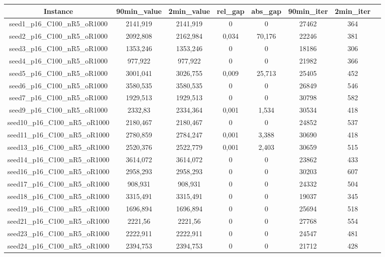 \documentclass[a4paper]{article}
\begin{document}
\begin{center}
\begin{longtable}{cccccccc}
\tabularnewline
\hline
Instance & 90min\_value & 2min\_value & rel\_gap & abs\_gap & 90min\_iter & 2min\_iter\\
\hline
seed1\_p16\_C100\_nR5\_oR1000 & 2141,919 & 2141,919 & 0 & 0 & 27462 & 364\\
\hline
seed2\_p16\_C100\_nR5\_oR1000 & 2092,808 & 2162,984 & 0,034 & 70,176 & 22246 & 381\\
\hline
seed3\_p16\_C100\_nR5\_oR1000 & 1353,246 & 1353,246 & 0 & 0 & 18186 & 306\\
\hline
seed4\_p16\_C100\_nR5\_oR1000 & 977,922 & 977,922 & 0 & 0 & 21982 & 366\\
\hline
seed5\_p16\_C100\_nR5\_oR1000 & 3001,041 & 3026,755 & 0,009 & 25,713 & 25405 & 452\\
\hline
seed6\_p16\_C100\_nR5\_oR1000 & 3580,535 & 3580,535 & 0 & 0 & 26849 & 546\\
\hline
seed7\_p16\_C100\_nR5\_oR1000 & 1929,513 & 1929,513 & 0 & 0 & 30798 & 582\\
\hline
seed9\_p16\_C100\_nR5\_oR1000 & 2332,83 & 2334,364 & 0,001 & 1,534 & 30534 & 418\\
\hline
seed10\_p16\_C100\_nR5\_oR1000 & 2180,467 & 2180,467 & 0 & 0 & 24852 & 537\\
\hline
seed11\_p16\_C100\_nR5\_oR1000 & 2780,859 & 2784,247 & 0,001 & 3,388 & 30690 & 418\\
\hline
seed13\_p16\_C100\_nR5\_oR1000 & 2520,376 & 2522,779 & 0,001 & 2,403 & 30659 & 515\\
\hline
seed14\_p16\_C100\_nR5\_oR1000 & 3614,072 & 3614,072 & 0 & 0 & 23862 & 433\\
\hline
seed16\_p16\_C100\_nR5\_oR1000 & 2958,293 & 2958,293 & 0 & 0 & 30203 & 607\\
\hline
seed17\_p16\_C100\_nR5\_oR1000 & 908,931 & 908,931 & 0 & 0 & 24332 & 504\\
\hline
seed18\_p16\_C100\_nR5\_oR1000 & 3315,491 & 3315,491 & 0 & 0 & 19037 & 345\\
\hline
seed19\_p16\_C100\_nR5\_oR1000 & 1696,894 & 1696,894 & 0 & 0 & 25694 & 518\\
\hline
seed21\_p16\_C100\_nR5\_oR1000 & 2221,56 & 2221,56 & 0 & 0 & 27768 & 554\\
\hline
seed23\_p16\_C100\_nR5\_oR1000 & 2222,911 & 2222,911 & 0 & 0 & 24547 & 481\\
\hline
seed24\_p16\_C100\_nR5\_oR1000 & 2394,753 & 2394,753 & 0 & 0 & 21712 & 428\\

\end{longtable}
\end{center}
\end{document}
